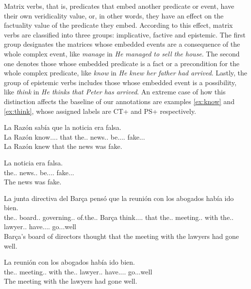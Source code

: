 Matrix verbs, that is, predicates that embed another predicate or event, have their own veridicality value, or, in other words, they have an effect on the factuality value of the predicate they embed. According to this effect, matrix verbs are classified into three groups: implicative, factive and epistemic. The first group designates the matrices whose embedded events are a consequence of the whole complex event, like \textit{manage} in \textit{He managed to sell the house}. The second one denotes those whose embedded predicate is a fact or a precondition for the whole complex predicate, like \textit{know} in \textit{He knew her father had arrived}. Lastly, the group of epistemic verbs includes those whose embedded event is a possibility, like \textit{think} in \textit{He thinks that Peter has arrived}. An extreme case of how this distinction affects the baseline of our annotations are examples \ref{ex:know} and \ref{ex:think}, whose assigned labels are CT+ and PS+ respectively.\\

\begin{exe}
  \ex\label{ex:know}
    \begin{xlist}
      \item{\gll La Razón sabía que la noticia era falsa.\\ La Razón know.\Pst.\Ipfv.\Ind.\Tsg{} that the.\F.\Sg{} news.\F.\Sg{} be.\Pst.\Ipfv.\Ind.\Tsg{} fake.\Ptcp.\M.\Sg{}\\\glt La Razón knew that the news was fake.}
      \item{\gll La noticia era falsa.\\ the.\F.\Sg{} news.\F.\Sg{} be.\Pst.\Ipfv.\Ind.\Tsg{} fake.\Ptcp.\M.\Sg{}\\\glt The news was fake.} \label{ex:hyp1}
    \end{xlist}
  \ex\label{ex:think}
   \begin{xlist}
    \item{\gll La junta directiva del Barça pensó que la reunión con los abogados había ido bien.\\ the.\F.\Sg{} board.\F.\Sg{} governing.\F.\Sg{} of.the.\M.\Sg{} Barça think.\Pst.\Pfv.\Ind.\Tsg{} that the.\F.\Sg{} meeting.\F.\Sg{} with the.\M.\Pl{} lawyer.\M.\Pl{} have.\Pst.\Ipfv.\Ind.\Tsg{} go.\Ptcp.\M.\Sg{}well \\\glt Barça's board of directors thought that the meeting with the lawyers had gone well.}
      \item{\gll La reunión con los abogados había ido bien.\\ the.\F.\Sg{} meeting.\F.\Sg{} with the.\M.\Pl{} lawyer.\M.\Pl{} have.\Pst.\Ipfv.\Ind.\Tsg{} go.\Ptcp.\M.\Sg{}well \\\glt The meeting with the lawyers had gone well.}\label{ex:hyp2}
    \end{xlist}
\end{exe}

